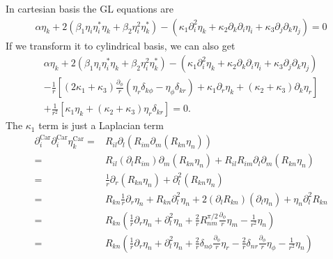 \documentclass[aps,prl,preprint]{revtex4-2}
\begin{document}
In cartesian basis the GL equations are
\begin{align}
    \alpha\eta_k+2(\beta_1\eta_i\eta_i^*\eta_k
    +\beta_2\eta_i^2\eta_k^*)-\left(\kappa_1\partial_i^2\eta_k
    +\kappa_2\partial_k\partial_i\eta_i
    +\kappa_3\partial_j\partial_k\eta_j\right)=0
\end{align}
If we transform it to cylindrical basis, we can also get
\begin{align}\label{GL-cylin}
    \alpha\eta_k+2(\beta_1\eta_i\eta_i^*\eta_k
    +\beta_2\eta_i^2\eta_k^*)-\left(\kappa_1\partial_i^2\eta_k
    +\kappa_2\partial_k\partial_i\eta_i
    +\kappa_3\partial_j\partial_k\eta_j\right)\nonumber  \\
    -\frac{1}{r}\left[(2\kappa_1+\kappa_3)\frac{\partial_\phi}{r}
        \left(\eta_r\delta_{k\phi}-\eta_\phi\delta_{kr}\right)+\kappa_1\partial_r\eta_k
    +(\kappa_2+\kappa_3)\partial_k\eta_r\right]\nonumber \\
    +\frac{1}{r^2}[\kappa_1\eta_k+(\kappa_2+\kappa_3)\eta_r\delta_{kr}]
    =0.
\end{align}
The $\kappa_1$ term is just a Laplacian term
\begin{align}
    \partial_i^\text{Car}\partial_i^\text{Car}\eta_k^\text{Car}= & R_{il}\partial_l(R_{im}\partial_m(R_{kn}\eta_n))                                                                      \\
    =                                                            & R_{il}(\partial_lR_{im})\partial_m(R_{kn}\eta_n) + R_{il}R_{im}\partial_l\partial_m(R_{kn}\eta_n)                     \\
    =                                                            & \frac{1}{r}\partial_r(R_{kn}\eta_n) + \partial_l^2(R_{kn}\eta_n)                                                      \\
    =                                                            & R_{kn}\frac{1}{r}\partial_r\eta_n + R_{kn}\partial_l^2\eta_n + 2(\partial_lR_{kn})(\partial_l\eta_n)
    + \eta_n\partial_l^2R_{kn}                                                                                                                                                           \\
    =                                                            & R_{kn}\left(\frac{1}{r}\partial_r\eta_n + \partial_l^2\eta_n + \frac{2}{r}R^{\pi/2}_{nm}\frac{\partial_\phi}{r}\eta_m
    -\frac{1}{r^2}\eta_n\right)                                                                                                                                                          \\
    =                                                            & R_{kn}\left(\frac{1}{r}\partial_r\eta_n + \partial_l^2\eta_n + \frac{2}{r}\delta_{n\phi}\frac{\partial_\phi}{r}\eta_r
    -\frac{2}{r}\delta_{nr}\frac{\partial_\phi}{r}\eta_\phi - \frac{1}{r^2}\eta_n\right)
\end{align}
\end{document}
